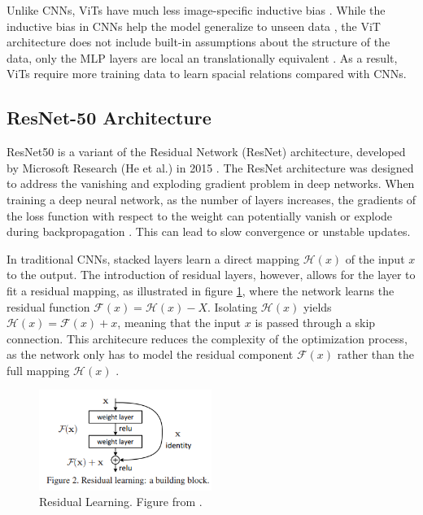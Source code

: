 Unlike CNNs, ViTs have much less image-specific inductive bias \cite{dosovitskiy2021imageworth16x16words}. While the inductive bias in CNNs help the model generalize to unseen data \cite{kim2020inductivebias}, the ViT architecture does not include built-in assumptions about the structure of the data, only the MLP layers are local an translationally equivalent \cite{dosovitskiy2021imageworth16x16words}. As a result, ViTs require more training data to learn spacial relations compared with CNNs.




\subsection{ResNet-50 Architecture}
\label{sec:resnet}
ResNet50 is a variant of the Residual Network (ResNet) architecture, developed by Microsoft Research (He et al.) in 2015 \cite{he2015deepresiduallearningimage}. The ResNet architecture was designed to address the vanishing and exploding gradient problem in deep networks. When training a deep neural network, as the number of layers increases, the gradients of the loss function with respect to the weight can potentially vanish or explode during backpropagation \cite{he2015deepresiduallearningimage}. This can lead to slow convergence or unstable updates.

In traditional CNNs, stacked layers learn a direct mapping $\mathcal{H}(x)$ of the input $x$ to the output. The introduction of residual layers, however, allows for the layer to fit a residual mapping, as illustrated in figure \ref{fig:res_learning}, where the network learns the residual function $\mathcal{F}(x) = \mathcal{H}(x) - X$. Isolating $\mathcal{H}(x)$ yields $\mathcal{H}(x) = \mathcal{F}(x) + x$, meaning that the input $x$ is passed through a skip connection. This architecure reduces the complexity of the optimization process, as the network only has to model the residual component $\mathcal{F}(x)$ rather than the full mapping $\mathcal{H}(x)$ \cite{he2015deepresiduallearningimage}.

\begin{figure}[ht]
    \centering
    \includegraphics[width=0.5\textwidth]{Images/res_learn.png} 
    \caption{Residual Learning. Figure from \cite{he2015deepresiduallearningimage}. }
    \label{fig:res_learning}
\end{figure}

